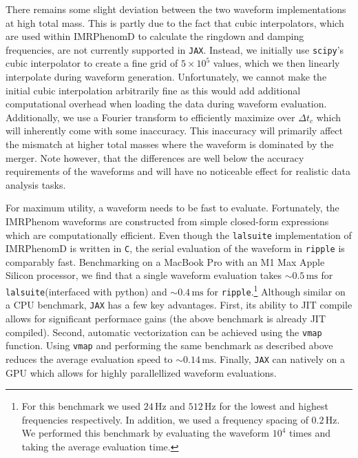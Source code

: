 \documentclass[twocolumn]{aastex631}
\newcommand{\jax}{\texttt{JAX}\xspace}
\newcommand{\ripple}{\texttt{ripple}\xspace}
\newcommand{\lalsuite}{\texttt{lalsuite}\xspace}
\newcommand{\te}[1]{\textbf{\color{pyGreen}(TE: #1)}}
\newcommand{\dfm}[1]{{\color{dfm}[DFM: #1]}}
\begin{document}
There remains some slight deviation between the two waveform implementations at high total mass. 
This is partly due to the fact that cubic interpolators, which are used within IMRPhenomD to calculate the ringdown and damping frequencies, are not currently supported in \jax. 
Instead, we initially use \texttt{scipy}'s cubic interpolator to create a fine grid of $5\times10^5$ values, which we then linearly interpolate during waveform generation.
Unfortunately, we cannot make the initial cubic interpolation arbitrarily fine as this would add additional computational overhead when loading the data during waveform evaluation.
Additionally, we use a Fourier transform to efficiently maximize over $\Delta t_c$ which will inherently come with some inaccuracy.
This inaccuracy will primarily affect the mismatch at higher total masses where the waveform is dominated by the merger.
Note however, that the differences are well below the accuracy requirements of the waveforms and will have no noticeable effect for realistic data analysis tasks.

For maximum utility, a waveform needs to be fast to evaluate.
Fortunately, the IMRPhenom waveforms are constructed from simple closed-form expressions which are computationally efficient.
Even though the \lalsuite implementation of IMRPhenomD is written in \texttt{C}, the serial evaluation of the waveform in \ripple is comparably fast. 
Benchmarking on a MacBook Pro with an M1 Max Apple Silicon processor, we find that a single waveform evaluation takes $\sim 0.5\,\mathrm{ms}$ for \lalsuite (interfaced with python) and $\sim 0.4\,\mathrm{ms}$ for \ripple.\footnote{
    For this benchmark we used $24\,\mathrm{Hz}$ and $512\,\mathrm{Hz}$ for the lowest and highest frequencies respectively. 
    In addition, we used a frequency spacing of $0.2\,\mathrm{Hz}$. 
    We performed this benchmark by evaluating the waveform $10^{4}$ times and taking the average evaluation time.
}
Although similar on a CPU benchmark, \jax has a few key advantages. 
First, its ability to JIT compile allows for significant performace gains (the above benchmark is already JIT compiled).
Second, automatic vectorization can be achieved using the \texttt{vmap} function.
Using \texttt{vmap} and performing the same benchmark as described above reduces the average evaluation speed to $\sim 0.14\,\mathrm{ms}$.
Finally, \jax can natively on a GPU which allows for highly parallellized waveform evaluations.
\end{document}

